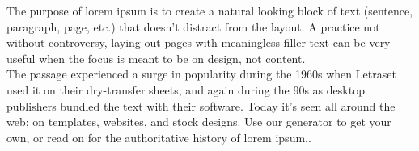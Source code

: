 The purpose of lorem ipsum is to create a natural looking block of text (sentence, paragraph, page, etc.) that doesn't distract from the layout. A practice not without controversy, laying out pages with meaningless filler text can be very useful when the focus is meant to be on design, not content.\\

The passage experienced a surge in popularity during the 1960s when Letraset used it on their dry-transfer sheets, and again during the 90s as desktop publishers bundled the text with their software. Today it's seen all around the web; on templates, websites, and stock designs. Use our generator to get your own, or read on for the authoritative history of lorem ipsum..\\
